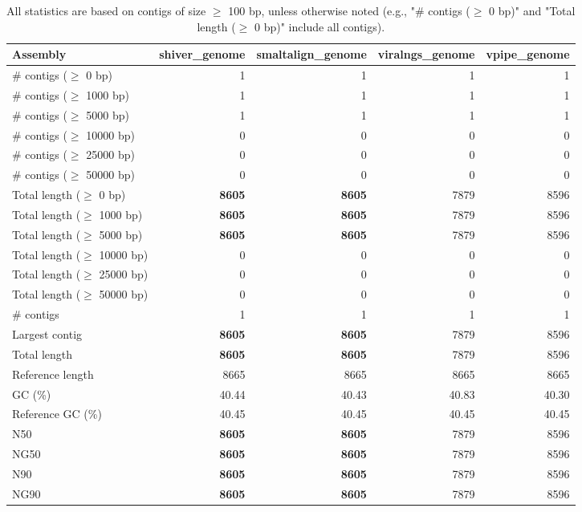 \documentclass[12pt,a4paper]{article}
\begin{document}
\begin{table}[ht]
\begin{center}
\caption{All statistics are based on contigs of size $\geq$ 100 bp, unless otherwise noted (e.g., "\# contigs ($\geq$ 0 bp)" and "Total length ($\geq$ 0 bp)" include all contigs).}
\begin{tabular}{|l*{4}{|r}|}
\hline
Assembly & shiver\_genome & smaltalign\_genome & viralngs\_genome & vpipe\_genome \\ \hline
\# contigs ($\geq$ 0 bp) & 1 & 1 & 1 & 1 \\ \hline
\# contigs ($\geq$ 1000 bp) & 1 & 1 & 1 & 1 \\ \hline
\# contigs ($\geq$ 5000 bp) & 1 & 1 & 1 & 1 \\ \hline
\# contigs ($\geq$ 10000 bp) & 0 & 0 & 0 & 0 \\ \hline
\# contigs ($\geq$ 25000 bp) & 0 & 0 & 0 & 0 \\ \hline
\# contigs ($\geq$ 50000 bp) & 0 & 0 & 0 & 0 \\ \hline
Total length ($\geq$ 0 bp) & {\bf 8605} & {\bf 8605} & 7879 & 8596 \\ \hline
Total length ($\geq$ 1000 bp) & {\bf 8605} & {\bf 8605} & 7879 & 8596 \\ \hline
Total length ($\geq$ 5000 bp) & {\bf 8605} & {\bf 8605} & 7879 & 8596 \\ \hline
Total length ($\geq$ 10000 bp) & 0 & 0 & 0 & 0 \\ \hline
Total length ($\geq$ 25000 bp) & 0 & 0 & 0 & 0 \\ \hline
Total length ($\geq$ 50000 bp) & 0 & 0 & 0 & 0 \\ \hline
\# contigs & 1 & 1 & 1 & 1 \\ \hline
Largest contig & {\bf 8605} & {\bf 8605} & 7879 & 8596 \\ \hline
Total length & {\bf 8605} & {\bf 8605} & 7879 & 8596 \\ \hline
Reference length & 8665 & 8665 & 8665 & 8665 \\ \hline
GC (\%) & 40.44 & 40.43 & 40.83 & 40.30 \\ \hline
Reference GC (\%) & 40.45 & 40.45 & 40.45 & 40.45 \\ \hline
N50 & {\bf 8605} & {\bf 8605} & 7879 & 8596 \\ \hline
NG50 & {\bf 8605} & {\bf 8605} & 7879 & 8596 \\ \hline
N90 & {\bf 8605} & {\bf 8605} & 7879 & 8596 \\ \hline
NG90 & {\bf 8605} & {\bf 8605} & 7879 & 8596 \\ \hline

\end{tabular}
\end{center}
\end{table}
\end{document}
